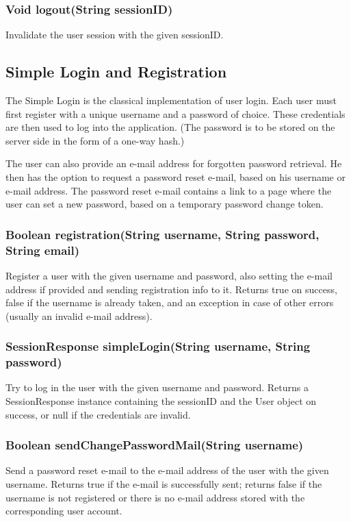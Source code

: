 \subsubsection{Void logout(String sessionID)}
Invalidate the user session with the given sessionID.

\subsection{Simple Login and Registration}
\label{subsec:simple_login}

The Simple Login is the classical implementation of user login. Each user must first register with a unique username and a password of choice. These credentials are then used to log into the application. (The password is to be stored on the server side in the form of a one-way hash.)

The user can also provide an e-mail address for forgotten password retrieval. He then has the option to request a password reset e-mail, based on his username or e-mail address. The password reset e-mail contains a link to a page where the user can set a new password, based on a temporary password change token.

\subsubsection{Boolean registration(String username, String password, String email)}
Register a user with the given username and password, also setting the e-mail address if provided and sending registration info to it.
Returns true on success, false if the username is already taken, and an exception in case of other errors (usually an invalid e-mail address).

\subsubsection{SessionResponse simpleLogin(String username, String password)}
Try to log in the user with the given username and password.
Returns a SessionResponse instance containing the sessionID and the User object on success, or null if the credentials are invalid.

\subsubsection{Boolean sendChangePasswordMail(String username)}
Send a password reset e-mail
to the e-mail address of the user with the given username.
Returns true if the e-mail is successfully sent;
returns false if the username is not registered or there is no e-mail address stored with the corresponding user account.

